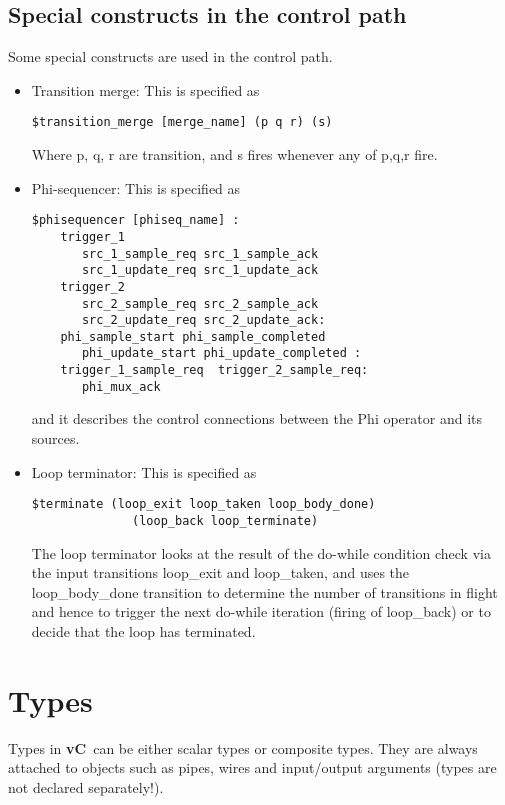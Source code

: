 \documentclass{article}
\newcommand{\vC}{{\bf vC}~}
\begin{document}
\subsection{Special constructs in the control path}

Some special constructs are used in the control path.
\begin{itemize}
\item Transition merge:  This is specified as
\begin{verbatim}
$transition_merge [merge_name] (p q r) (s)
\end{verbatim}
Where p, q, r are transition, and s fires whenever any 
of p,q,r fire.
\item  Phi-sequencer:   This is specified
as
\begin{verbatim}
$phisequencer [phiseq_name] :  
    trigger_1
       src_1_sample_req src_1_sample_ack
       src_1_update_req src_1_update_ack
    trigger_2
       src_2_sample_req src_2_sample_ack
       src_2_update_req src_2_update_ack:
    phi_sample_start phi_sample_completed
       phi_update_start phi_update_completed :
    trigger_1_sample_req  trigger_2_sample_req:
       phi_mux_ack
\end{verbatim}
and it describes the control connections between the Phi operator and
its sources.
\item Loop terminator: This is specified as
\begin{verbatim}
$terminate (loop_exit loop_taken loop_body_done) 
              (loop_back loop_terminate)
\end{verbatim}
The loop terminator looks at the result of the do-while condition
check via the input transitions loop\_exit and loop\_taken, 
and uses the loop\_body\_done transition to determine the
number of transitions in flight and hence to trigger the
next do-while iteration (firing of loop\_back) or to
decide that the loop has terminated.
\end{itemize}

\section{Types} \label{sec:Types}

Types in \vC can be either scalar types or composite types.  They
are always attached to objects such as pipes, wires and input/output
arguments (types are not declared separately!).
\end{document}
